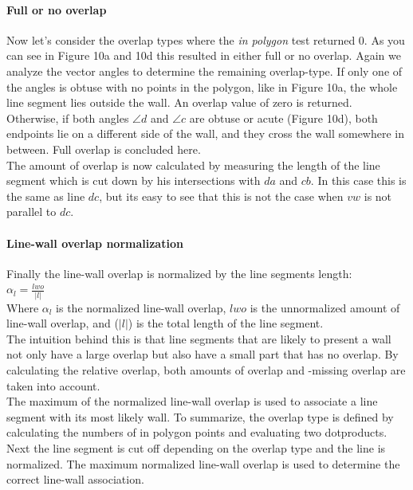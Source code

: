 \documentclass[10pt]{article}
\begin{document}
{	\paragraph{Full or no overlap}
	Now let's consider the overlap types where the \emph{in polygon} test
	returned 0.
	As you can see in Figure 10a and 10d this resulted in either full or no overlap.
	Again we analyze the vector angles to determine the remaining overlap-type.
	If only one of the angles is obtuse with no points in the polygon, like in Figure 10a,
	the whole line segment lies outside the wall. An overlap value of zero
	is returned.\\
	Otherwise, if both angles $\angle d$ and $\angle c$ are obtuse or acute (Figure 10d),
	both endpoints lie on a different side of the wall, and they cross the wall somewhere in
	between. Full overlap is concluded here. \\
	The amount of overlap is now calculated by measuring the length
	of the line segment which is cut down by his intersections with $da$ and
	$cb$. In this case this is the same as line $dc$, but its easy to see that
	this is not the case when $vw$ is not parallel to $dc$.\\
	
	\paragraph{Line-wall overlap normalization}
	Finally the line-wall overlap is normalized by the line segments length:\\
	$\alpha_l = \frac{lwo}{|l|}$\\
	Where $\alpha_l$ is the normalized line-wall overlap, $lwo$ is the unnormalized
	amount of line-wall overlap, and ($|l|$) is the total length of the line
	segment.\\
	The intuition behind this is that line segments that are likely to
	present a wall not only have a large overlap but also have a small part
	that has no overlap. By calculating the relative overlap, both amounts of overlap
	and -missing overlap are taken into account.\\
	The maximum of the normalized line-wall overlap is used to associate a
	line segment with its most likely wall.
	To summarize, the overlap type is defined by calculating the numbers of in
	polygon points and evaluating two dotproducts. Next the line segment is cut off
	depending on the overlap type and the line is normalized. The maximum
	normalized line-wall overlap is used to determine the correct line-wall
	association.\\

}
\end{document}
